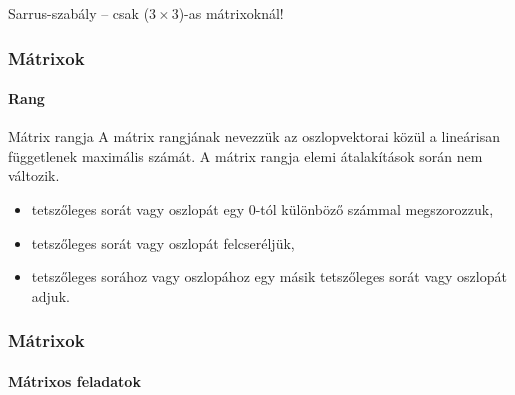 \begin{frame}
\begin{block}{Sarrus-szabály -- csak ($3 \times 3$)-as mátrixoknál!}
  \end{block}
\end{frame}

\begin{frame}
  \frametitle{Mátrixok}
  \framesubtitle{Rang}

  \begin{block}{Mátrix rangja}
    A mátrix rangjának nevezzük az oszlopvektorai közül a lineárisan függetlenek
    maximális számát. A mátrix rangja elemi átalakítások során nem változik.
    \begin{itemize}
      \item tetszőleges sorát vagy oszlopát egy 0-tól különböző számmal
            megszorozzuk,
      \item tetszőleges sorát vagy oszlopát felcseréljük,
      \item tetszőleges sorához vagy oszlopához egy másik tetszőleges sorát
            vagy oszlopát adjuk.
    \end{itemize}
  \end{block}
\end{frame}

\begin{frame}
  \frametitle{Mátrixok}
  \framesubtitle{Mátrixos feladatok}

  \vfill
  
  \vfill
  
  \vfill
\end{frame}

